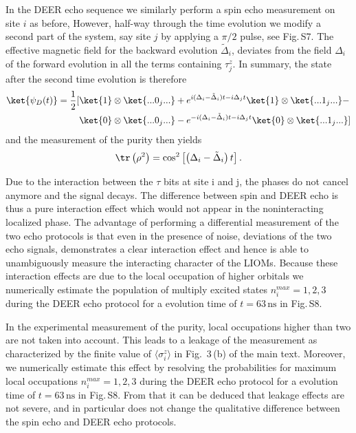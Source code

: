 In the DEER echo sequence we similarly perform a spin echo measurement on site $i$ as before, However, half-way through the time evolution we modify a second part of the system, say site $j$ by applying a $\pi/2$ pulse, see
Fig.\,S7. The effective magnetic field for the backward evolution $\tilde \Delta_i$, deviates from the field $\Delta_i$ of the forward evolution in all the terms containing $\tau_j^z$.
In summary, the state after the second time evolution is therefore
\begin{equation}
\begin{aligned}
\ket{\psi_{D}(t)} = \frac{1}{2} [& \ket{1}\otimes\ket{...0_j...} + e^{i (\Delta_i-\tilde{\Delta}_i) t - i\Delta_j t} \ket{1}\otimes \ket{...1_j...} - \\
&\ket{0}\otimes\ket{...0_j...}- e^{-i (\Delta_i-\tilde{\Delta}_i) t - i \Delta_j t} \ket{0}\otimes \ket{...1_j...}
]
\label{eq:deer_finaltime}
\end{aligned}
\end{equation}
and the measurement of the purity then yields
\begin{equation}
\tr \left(\rho^2\right) = \cos^2\left[\left(\Delta_i-\tilde{\Delta}_i\right) t\right].
\end{equation}

Due to the interaction between the $\tau$ bits at site i and j, the phases do not cancel anymore and the signal decays. The difference between spin and DEER echo is thus a pure interaction effect which would not appear in the noninteracting localized phase. The advantage of performing a differential measurement of the two echo protocols is that even in the presence of noise, deviations of the two echo signals, demonstrates a clear interaction effect and hence is able to unambiguously measure the interacting character of the LIOMs.
Because these interaction effects are due to the local occupation of higher orbitals we numerically estimate the population of multiply excited states $n_i^{max} = 1,2,3$ during the DEER echo protocol for a evolution time of $t = 63 \, \text{ns}$ in Fig.\,S8.

In the experimental measurement of the purity, local occupations higher than two are not taken into account. This leads to a leakage of the measurement as characterized by the finite value of $\langle \sigma^z_i\rangle$ in Fig. \,3\,(b) of the main text. Moreover, we numerically estimate this effect by resolving the probabilities for maximum local occupations $n_i^{max} = 1,2,3$ during the DEER echo protocol for a evolution time of $t = 63 \, \text{ns}$ in Fig.\,S8.
From that it can be deduced that leakage effects are not severe, and in particular does not change the qualitative difference between the spin echo and DEER echo protocols.

